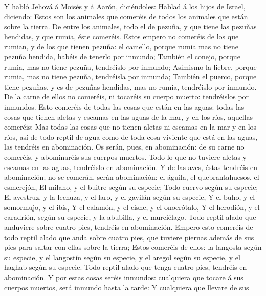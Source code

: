  Y habló Jehová á Moisés y á Aarón, diciéndoles:
 Hablad á los hijos de Israel, diciendo: Estos son los
animales que comeréis de todos los animales que están sobre la tierra.
 De entre los animales, todo el de pezuña, y que tiene las
pezuñas hendidas, y que rumia, éste comeréis.  Estos empero
no comeréis de los que rumian, y de los que tienen pezuña: el camello,
porque rumia mas no tiene pezuña hendida, habéis de tenerlo por inmundo;
 También el conejo, porque rumia, mas no tiene pezuña,
tendréislo por inmundo;  Asimismo la liebre, porque rumia,
mas no tiene pezuña, tendréisla por inmunda;  También el
puerco, porque tiene pezuñas, y es de pezuñas hendidas, mas no rumia,
tendréislo por inmundo.  De la carne de ellos no comeréis,
ni tocaréis su cuerpo muerto: tendréislos por inmundos. 
Esto comeréis de todas las cosas que están en las aguas: todas las cosas
que tienen aletas y escamas en las aguas de la mar, y en los ríos,
aquellas comeréis;  Mas todas las cosas que no tienen
aletas ni escamas en la mar y en los ríos, así de todo reptil de agua
como de toda cosa viviente que está en las aguas, las tendréis en
abominación.  Os serán, pues, en abominación: de su carne
no comeréis, y abominaréis sus cuerpos muertos.  Todo lo
que no tuviere aletas y escamas en las aguas, tendréislo en abominación.
 Y de las aves, éstas tendréis en abominación; no se
comerán, serán abominación: el águila, el quebrantahuesos, el esmerejón,
 El milano, y el buitre según su especie; 
Todo cuervo según su especie;  El avestruz, y la lechuza, y
el laro, y el gavilán según su especie,  Y el buho, y el
somormujo, y el ibis,  Y el calamón, y el cisne, y el
onocrótalo,  Y el herodión, y el caradrión, según su
especie, y la abubilla, y el murciélago.  Todo reptil alado
que anduviere sobre cuatro pies, tendréis en abominación. 
Empero esto comeréis de todo reptil alado que anda sobre cuatro pies,
que tuviere piernas además de sus pies para saltar con ellas sobre la
tierra;  Estos comeréis de ellos: la langosta según su
especie, y el langostín según su especie, y el aregol según su especie,
y el haghab según su especie.  Todo reptil alado que tenga
cuatro pies, tendréis en abominación.  Y por estas cosas
seréis inmundos: cualquiera que tocare á sus cuerpos muertos, será
inmundo hasta la tarde:  Y cualquiera que llevare de sus
